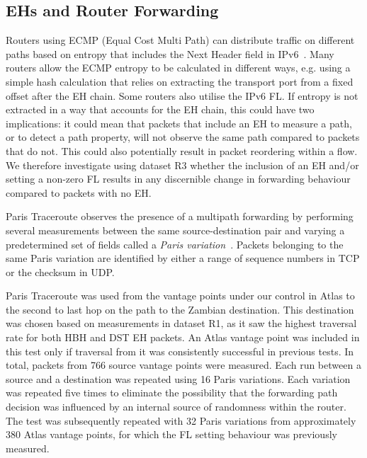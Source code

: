 \documentclass[conference]{IEEEtran}
\begin{document}
\subsection{EHs and Router Forwarding}

Routers using ECMP (Equal Cost Multi Path) can distribute traffic on different paths based on entropy that includes the Next Header field in
IPv6~\cite{lb-classification}. 
Many routers allow the ECMP entropy to be calculated in different ways,
e.g. using a simple hash calculation that relies on extracting the transport port from a fixed offset after the EH chain. Some routers also utilise the IPv6 FL.
If entropy is not extracted in a way that accounts for the EH chain, this could have two implications: it could mean that packets that include an EH to measure a path, or to detect a path property, will not observe the same path compared to packets that do not. This could also potentially result in packet reordering within a flow. 
We therefore investigate using dataset R3 whether the inclusion of an EH and/or setting a non-zero FL results in any discernible change in forwarding behaviour compared to packets with no EH.

% 


Paris Traceroute observes the presence of a multipath forwarding by 
performing several measurements between the same
source-destination pair and varying a predetermined set of fields called a
\textit{Paris variation}~\cite{augustin2006avoiding}.  Packets belonging to the
same Paris variation are identified by either a range of sequence numbers in
TCP or the checksum in UDP.


Paris Traceroute was used from the vantage points under our control in Atlas to
the second to last hop on the path to the Zambian destination. This destination was chosen based on measurements in dataset R1, as it saw the highest traversal rate for both HBH and DST EH packets. An Atlas vantage point was included in this test only if traversal from it was consistently successful in previous tests. In total, packets from 766
source vantage points were measured.  Each run between a source and a destination was
repeated using 16 Paris variations.  Each variation was repeated five
times to eliminate the possibility that the forwarding path decision was
influenced by an internal source of randomness within the router. 
The test was subsequently repeated with 32 Paris variations from approximately 380 Atlas vantage points, for which the FL setting behaviour was previously measured.
\end{document}
